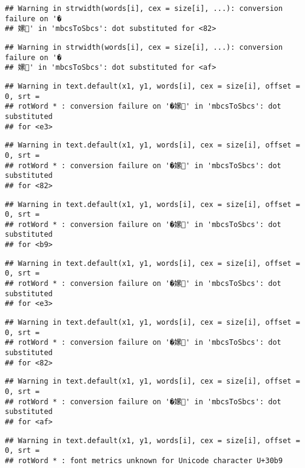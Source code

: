 \documentclass[]{article}
\begin{document}
\begin{verbatim}
## Warning in strwidth(words[i], cex = size[i], ...): conversion failure on '�
## 嫘' in 'mbcsToSbcs': dot substituted for <82>
\end{verbatim}

\begin{verbatim}
## Warning in strwidth(words[i], cex = size[i], ...): conversion failure on '�
## 嫘' in 'mbcsToSbcs': dot substituted for <af>
\end{verbatim}

\begin{verbatim}
## Warning in text.default(x1, y1, words[i], cex = size[i], offset = 0, srt =
## rotWord * : conversion failure on '�嫘' in 'mbcsToSbcs': dot substituted
## for <e3>
\end{verbatim}

\begin{verbatim}
## Warning in text.default(x1, y1, words[i], cex = size[i], offset = 0, srt =
## rotWord * : conversion failure on '�嫘' in 'mbcsToSbcs': dot substituted
## for <82>
\end{verbatim}

\begin{verbatim}
## Warning in text.default(x1, y1, words[i], cex = size[i], offset = 0, srt =
## rotWord * : conversion failure on '�嫘' in 'mbcsToSbcs': dot substituted
## for <b9>
\end{verbatim}

\begin{verbatim}
## Warning in text.default(x1, y1, words[i], cex = size[i], offset = 0, srt =
## rotWord * : conversion failure on '�嫘' in 'mbcsToSbcs': dot substituted
## for <e3>
\end{verbatim}

\begin{verbatim}
## Warning in text.default(x1, y1, words[i], cex = size[i], offset = 0, srt =
## rotWord * : conversion failure on '�嫘' in 'mbcsToSbcs': dot substituted
## for <82>
\end{verbatim}

\begin{verbatim}
## Warning in text.default(x1, y1, words[i], cex = size[i], offset = 0, srt =
## rotWord * : conversion failure on '�嫘' in 'mbcsToSbcs': dot substituted
## for <af>
\end{verbatim}

\begin{verbatim}
## Warning in text.default(x1, y1, words[i], cex = size[i], offset = 0, srt =
## rotWord * : font metrics unknown for Unicode character U+30b9
\end{verbatim}
\end{document}
